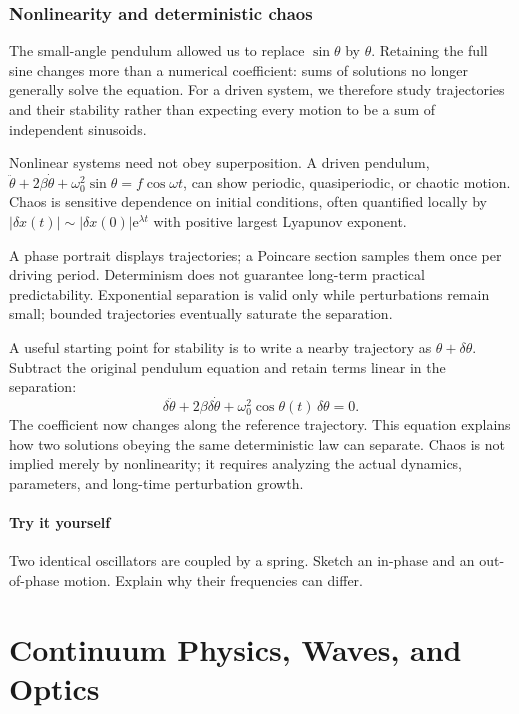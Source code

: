 \documentclass[11pt,oneside]{book}
\newcommand{\ee}{\mathrm{e}}
\theoremstyle{reviewstyle}
\newcommand{\learningcheck}[1]{\subsection*{Try it yourself}\noindent #1\par}
\begin{document}
\section{Nonlinearity and deterministic chaos}
The small-angle pendulum allowed us to replace $\sin\theta$ by $\theta$. Retaining the full sine changes more than a numerical coefficient: sums of solutions no longer generally solve the equation. For a driven system, we therefore study trajectories and their stability rather than expecting every motion to be a sum of independent sinusoids.

Nonlinear systems need not obey superposition. A driven pendulum,
$\ddot\theta+2\beta\dot\theta+\omega_0^2\sin\theta=f\cos\omega t$,
can show periodic, quasiperiodic, or chaotic motion. Chaos is sensitive dependence on initial conditions, often quantified locally by
$|\delta x(t)|\sim|\delta x(0)|\ee^{\lambda t}$ with positive largest Lyapunov exponent.

A phase portrait displays trajectories; a Poincare section samples them once per driving period. Determinism does not guarantee long-term practical predictability. Exponential separation is valid only while perturbations remain small; bounded trajectories eventually saturate the separation.

A useful starting point for stability is to write a nearby trajectory as $\theta+\delta\theta$. Subtract the original pendulum equation and retain terms linear in the separation:
\begin{equation}
\delta\ddot\theta+2\beta\delta\dot\theta
+\omega_0^2\cos\theta(t)\,\delta\theta=0.
\end{equation}
The coefficient now changes along the reference trajectory. This equation explains how two solutions obeying the same deterministic law can separate. Chaos is not implied merely by nonlinearity; it requires analyzing the actual dynamics, parameters, and long-time perturbation growth.

\learningcheck{Two identical oscillators are coupled by a spring. Sketch an in-phase and an out-of-phase motion. Explain why their frequencies can differ.}

\part{Continuum Physics, Waves, and Optics}
\end{document}
